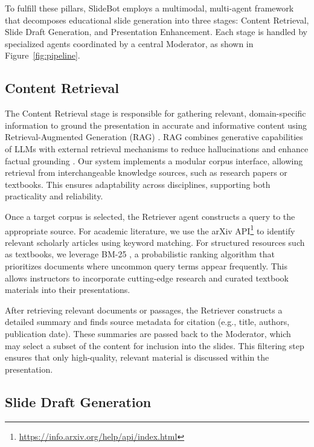 \documentclass[letterpaper]{article} %
\begin{document}
To fulfill these pillars, SlideBot employs a multimodal, multi-agent framework that decomposes educational slide generation into three stages: Content Retrieval, Slide Draft Generation, and Presentation Enhancement. Each stage is handled by specialized agents coordinated by a central Moderator, as shown in Figure~\ref{fig:pipeline}. 


\subsection{Content Retrieval}

The Content Retrieval stage is responsible for gathering relevant, domain-specific information to ground the presentation in accurate and informative content using Retrieval-Augmented Generation (RAG) \citep{lewis2020retrieval}. RAG combines generative capabilities of LLMs with external retrieval mechanisms to reduce hallucinations and enhance factual grounding \citep{bechard2024reducing}. Our system implements a modular corpus interface, allowing retrieval from interchangeable knowledge sources, such as research papers or textbooks. This ensures adaptability across disciplines, supporting both practicality and reliability.

Once a target corpus is selected, the Retriever agent constructs a query to the appropriate source. For academic literature, we use the arXiv API\footnote{\url{https://info.arxiv.org/help/api/index.html}} to identify relevant scholarly articles using keyword matching. For structured resources such as textbooks, we leverage BM-25 \citep{robertson2009probabilistic}, a probabilistic ranking algorithm that prioritizes documents where uncommon query terms appear frequently. This allows instructors to incorporate cutting-edge research and curated textbook materials into their presentations.

After retrieving relevant documents or passages, the Retriever constructs a detailed summary and finds source metadata for citation (e.g., title, authors, publication date). These summaries are passed back to the Moderator, which may select a subset of the content for inclusion into the slides. This filtering step ensures that only high-quality, relevant material is discussed within the presentation.



\subsection{Slide Draft Generation}
\end{document}
